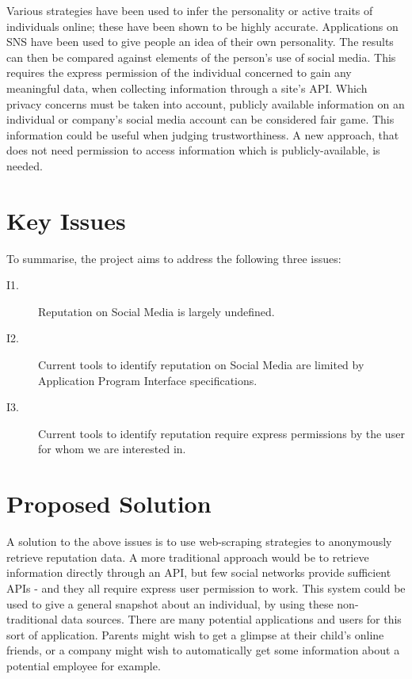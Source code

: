 Various strategies have been used to infer the personality or active traits of individuals online; these have been shown to be highly accurate. Applications on SNS have been used to give people an idea of their own personality. The results can then be compared against elements of the person's use of social media. This requires the express permission of the individual concerned to gain any meaningful data, when collecting information through a site's API. Which privacy concerns must be taken into account, publicly available information on an individual or company's social media account can be considered fair game. This information could be useful when judging trustworthiness. A new approach, that does not need permission to access information which is publicly-available, is needed. 

\section{Key Issues}

To summarise, the project aims to address the following three issues:

\begin{description}
	\item [I1.] Reputation on Social Media is largely undefined.
	\item [I2.] Current tools to identify reputation on Social Media are limited by Application Program Interface specifications.
	\item [I3.] Current tools to identify reputation require express permissions by the user for whom we are interested in.
\end{description}

\section{Proposed Solution}
A solution to the above issues is to use web-scraping strategies to anonymously retrieve reputation data. A more traditional approach would be to retrieve information directly through an API, but few social networks provide sufficient APIs - and they all require express user permission to work. This system could be used to give a general snapshot about an individual, by using these non-traditional data sources. There are many potential applications and users for this sort of application. Parents might wish to get a glimpse at their child's online friends, or a company might wish to automatically get some information about a potential employee for example.

